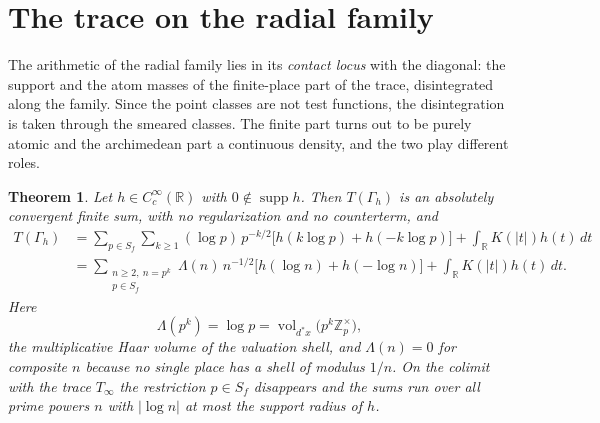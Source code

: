 \documentclass[11pt]{amsart}
\newtheorem{theorem}{Theorem}[section]
\theoremstyle{definition}
\theoremstyle{remark}
\newcommand{\R}{\mathbb R}
\newcommand{\Z}{\mathbb Z}
\newcommand{\supp}{\operatorname{supp}}
\newcommand{\vol}{\operatorname{vol}}
\begin{document}
\section{The trace on the radial family}
\label{sec:radtrace}

The arithmetic of the radial family lies in its \emph{contact locus} with the
diagonal: the support and the atom masses of the finite-place part of the
trace, disintegrated along the family.  Since the point classes are not test
functions, the disintegration is taken through the smeared classes.  The
finite part turns out to be purely atomic and the archimedean part a
continuous density, and the two play different roles.

\begin{theorem}\label{thm:radtrace}
Let $h\in C_c^\infty(\R)$ with $0\notin\supp h$. Then $T(\Gamma_h)$ is an
absolutely convergent finite sum, with no regularization and no counterterm,
and
\begin{align}
  T(\Gamma_h)&=\sum_{p\in S_f}\sum_{k\ge1}(\log p)\,p^{-k/2}
    \bigl[h(k\log p)+h(-k\log p)\bigr]+\int_\R K(|t|)h(t)\,dt
     \label{eq:radtrace}\\
  &=\sum_{\substack{n\ge2,\ n=p^k\\ p\in S_f}}\Lambda(n)\,n^{-1/2}
    \bigl[h(\log n)+h(-\log n)\bigr]+\int_\R K(|t|)h(t)\,dt .
     \label{eq:radtraceprime}
\end{align}
Here
\begin{equation}\label{eq:lambdavol}
  \Lambda(p^k)=\log p=\vol_{d^*x}\bigl(p^k\Z_p^\times\bigr),
\end{equation}
the multiplicative Haar volume of the valuation shell, and $\Lambda(n)=0$ for
composite $n$ because no single place has a shell of modulus $1/n$. On the
colimit with the trace $T_\infty$ the restriction $p\in S_f$ disappears and the
sums run over all prime powers $n$ with $|\log n|$ at most the support radius
of $h$.
\end{theorem}
\end{document}
